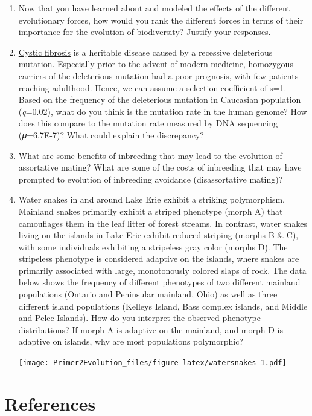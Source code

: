 \documentclass[
]{book}
\begin{document}
\begin{enumerate}
\def\labelenumi{\arabic{enumi}.}
\item
  Now that you have learned about and modeled the effects of the different evolutionary forces, how would you rank the different forces in terms of their importance for the evolution of biodiversity? Justify your responses.
\item
  \href{https://en.wikipedia.org/wiki/Cystic_fibrosis}{Cystic fibrosis} is a heritable disease caused by a recessive deleterious mutation. Especially prior to the advent of modern medicine, homozygous carriers of the deleterious mutation had a poor prognosis, with few patients reaching adulthood. Hence, we can assume a selection coefficient of s=1. Based on the frequency of the deleterious mutation in Caucasian population (\emph{q}=0.02), what do you think is the mutation rate in the human genome? How does this compare to the mutation rate measured by DNA sequencing (𝜇=6.7E-7)? What could explain the discrepancy?
\item
  What are some benefits of inbreeding that may lead to the evolution of assortative mating? What are some of the costs of inbreeding that may have prompted to evolution of inbreeding avoidance (disassortative mating)?
\item
  Water snakes in and around Lake Erie exhibit a striking polymorphism. Mainland snakes primarily exhibit a striped phenotype (morph A) that camouflages them in the leaf litter of forest streams. In contrast, water snakes living on the islands in Lake Erie exhibit reduced striping (morphs B \& C), with some individuals exhibiting a stripeless gray color (morphs D). The stripeless phenotype is considered adaptive on the islands, where snakes are primarily associated with large, monotonously colored slaps of rock. The data below shows the frequency of different phenotypes of two different mainland populations (Ontario and Peninsular mainland, Ohio) as well as three different island populations (Kelleys Island, Bass complex islands, and Middle and Pelee Islands). How do you interpret the observed phenotype distributions? If morph A is adaptive on the mainland, and morph D is adaptive on islands, why are most populations polymorphic?

  \texttt{[image: Primer2Evolution\_files/figure-latex/watersnakes-1.pdf]}
\end{enumerate}

\hypertarget{references-6}{%
\section{References}\label{references-6}}
\end{document}
